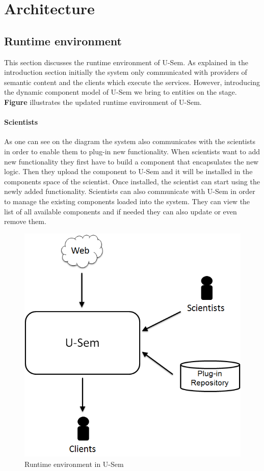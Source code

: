 \section{Architecture}



\subsection{Runtime environment}

This section discusses the runtime environment of U-Sem. As explained in the introduction section initially the system only communicated with providers of semantic content and the clients which execute the services. However, introducing the dynamic component model of U-Sem we bring to entities on the stage. \textbf{Figure} illustrates the updated runtime environment of U-Sem.

\paragraph{Scientists}
As one can see on the diagram the system also communicates with the scientists in order to enable them to plug-in new functionality. When scientists want to add new functionality they first have to build a component that encapsulates the new logic. Then they upload the component to U-Sem and it will be installed in the components space of the scientist. Once installed, the scientist can start using the newly added functionality. Scientists can also communicate with U-Sem in order to manage the existing components loaded into the system. They can view the list of all available components and if needed they can also update or even remove them. 

\begin{figure}[h!]
  \centering
  	\includegraphics[scale=0.5]{plug-in/environment/runtime_env.png}
  \caption{Runtime environment in U-Sem }
\end{figure}

